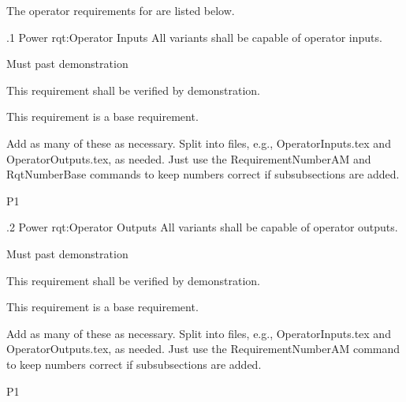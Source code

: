 The operator requirements for \ThisSystem are listed below.

\ONERQMTVKPP
{\RqtNumberBase.1}
{Power}
{rqt:Operator Inputs}
{All \ThisSys variants shall be capable of \TBD operator inputs.}
{
	\item [Phase 1] Must past demonstration
}
{This requirement shall be verified by demonstration.}
{
	\item [N/A] This requirement is a base requirement.
}
{
  \item Add as many of these as necessary. Split into files, e.g., OperatorInputs.tex and OperatorOutputs.tex, as needed. Just use the RequirementNumberAM and RqtNumberBase commands to keep numbers correct if subsubsections are added.
}
{P1}

\ONERQMTVKPP
{\RqtNumberBase.2}
{Power}
{rqt:Operator Outputs}
{All \ThisSys variants shall be capable of \TBD operator outputs.}
{
	\item [Phase 1] Must past demonstration
}
{This requirement shall be verified by demonstration.}
{
	\item [N/A] This requirement is a base requirement.
}
{
  \item Add as many of these as necessary.  Split into files, e.g., OperatorInputs.tex and OperatorOutputs.tex, as needed. Just use the RequirementNumberAM command to keep numbers correct if subsubsections are added.
}
{P1}
